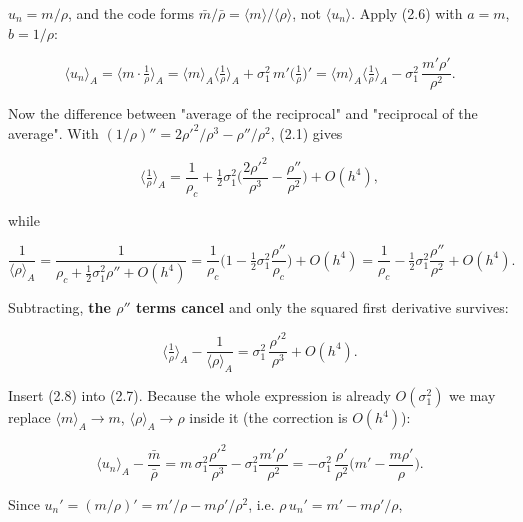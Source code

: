 \documentclass[11pt,a4paper]{article}
\begin{document}
$u_n=m/\rho$, and the code forms $\bar m/\bar\rho = \langle m\rangle/\langle\rho\rangle$,
not $\langle u_n\rangle$. Apply (2.6) with $a=m$, $b=1/\rho$:

\begin{equation*}
\langle u_n\rangle_A = \big\langle m\cdot\tfrac1\rho\big\rangle_A
= \langle m\rangle_A\Big\langle\tfrac1\rho\Big\rangle_A
+ \sigma_1^2\,m'\Big(\tfrac1\rho\Big)'
= \langle m\rangle_A\Big\langle\tfrac1\rho\Big\rangle_A
- \sigma_1^2\,\frac{m'\rho'}{\rho^2}.
\tag{2.7}
\end{equation*}

Now the difference between "average of the reciprocal" and "reciprocal of the
average". With $(1/\rho)''=2\rho'^2/\rho^3-\rho''/\rho^2$, (2.1) gives

\begin{equation*}
\Big\langle\tfrac1\rho\Big\rangle_A
= \frac1{\rho_c} + \tfrac12\sigma_1^2\Big(\frac{2\rho'^2}{\rho^3}-\frac{\rho''}{\rho^2}\Big)
+ O(h^4),
\end{equation*}

while

\begin{equation*}
\frac1{\langle\rho\rangle_A}
= \frac{1}{\rho_c+\tfrac12\sigma_1^2\rho''+O(h^4)}
= \frac1{\rho_c}\Big(1-\tfrac12\sigma_1^2\frac{\rho''}{\rho_c}\Big)+O(h^4)
= \frac1{\rho_c}-\tfrac12\sigma_1^2\frac{\rho''}{\rho^2}+O(h^4).
\end{equation*}

Subtracting, \textbf{the $\rho''$ terms cancel} and only the squared first derivative
survives:

\begin{equation*}
\Big\langle\tfrac1\rho\Big\rangle_A - \frac1{\langle\rho\rangle_A}
= \sigma_1^2\,\frac{\rho'^2}{\rho^3} + O(h^4).
\tag{2.8}
\end{equation*}

Insert (2.8) into (2.7). Because the whole expression is already $O(\sigma_1^2)$
we may replace $\langle m\rangle_A\to m$, $\langle\rho\rangle_A\to\rho$ inside it
(the correction is $O(h^4)$):

\begin{equation*}
\langle u_n\rangle_A - \frac{\bar m}{\bar\rho}
= m\,\sigma_1^2\frac{\rho'^2}{\rho^3} - \sigma_1^2\frac{m'\rho'}{\rho^2}
= -\sigma_1^2\,\frac{\rho'}{\rho^2}\Big(m'-\frac{m\rho'}{\rho}\Big).
\end{equation*}

Since $u_n'=(m/\rho)'=m'/\rho-m\rho'/\rho^2$, i.e. $\rho\,u_n' = m'-m\rho'/\rho$,
\end{document}
